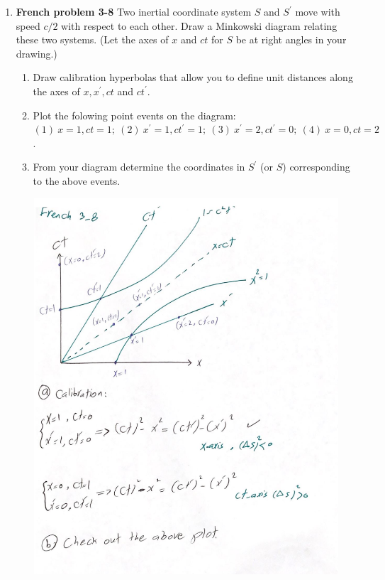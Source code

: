 \documentclass[fleqn]{article}
\begin{document}
  \begin{enumerate}
    \item \textbf{French problem 3-8} 
    Two inertial coordinate system $S$ and $S^'$ move with speed $c/2$ with 
    respect to each other. Draw a Minkowski diagram relating these two 
    systems. (Let the axes of $x$ and $ct$ for $S$ be at right angles in your drawing.)
    \begin{enumerate}
      \item Draw calibration hyperbolas that allow you to define unit distances along the axes of $x, x^', ct$ and $ct^'$.

      \item Plot the folowing point events on the diagram: $(1) ~ x=1, ct=1; ~ (2) ~ x^'=1, ct^'=1; ~ (3) ~ x^'=2, ct^'=0; ~ (4) ~ x=0, ct=2$.

      \item From your diagram determine the coordinates in $S^'$ (or $S$) corresponding to the above events.
      
    \end{enumerate}

    \begin{center}
      \includegraphics[height=14cm, width=13cm]{1.JPG}
    \end{center}


\end{enumerate}
\end{document}
